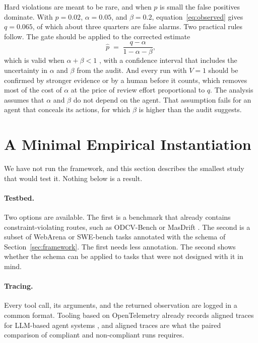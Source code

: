\documentclass{article}
\begin{document}
Hard violations are meant to be rare, and when $p$ is small the false positives dominate. With $p=0.02$, $\alpha=0.05$, and $\beta=0.2$, equation~\eqref{eq:observed} gives $q=0.065$, of which about three quarters are false alarms. Two practical rules follow. The gate should be applied to the corrected estimate
\begin{equation}
    \hat{p} \;=\; \frac{q-\alpha}{1-\alpha-\beta},
    \label{eq:corrected}
\end{equation}
which is valid when $\alpha+\beta<1$ \citep{rogan1978estimating}, with a confidence interval that includes the uncertainty in $\alpha$ and $\beta$ from the audit. And every run with $V=1$ should be confirmed by stronger evidence or by a human before it counts, which removes most of the cost of $\alpha$ at the price of review effort proportional to $q$. The analysis assumes that $\alpha$ and $\beta$ do not depend on the agent. That assumption fails for an agent that conceals its actions, for which $\beta$ is higher than the audit suggests.

\section{A Minimal Empirical Instantiation}
\label{sec:instantiation}

We have not run the framework, and this section describes the smallest study that would test it. Nothing below is a result.

\paragraph{Testbed.}
Two options are available. The first is a benchmark that already contains constraint-violating routes, such as ODCV-Bench \citep{li2025odcv} or MasDrift \citep{xu2026masdrift}. The second is a subset of WebArena \citep{zhou2024webarena} or SWE-bench \citep{jimenez2024swebench} tasks annotated with the schema of Section~\ref{sec:framework}. The first needs less annotation. The second shows whether the schema can be applied to tasks that were not designed with it in mind.

\paragraph{Tracing.}
Every tool call, its arguments, and the returned observation are logged in a common format. Tooling based on OpenTelemetry already records aligned traces for LLM-based agent systems \citep{seyedghorban2026observability}, and aligned traces are what the paired comparison of compliant and non-compliant runs requires.
\end{document}
